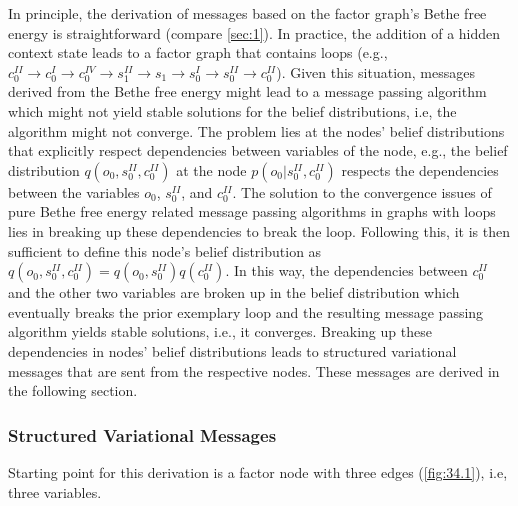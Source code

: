In principle, the derivation of messages based on the factor graph's Bethe free energy is straightforward (compare \cref{sec:1}). In practice, the addition of a hidden context state leads to a factor graph that contains loops (e.g., \(c^{\scriptscriptstyle II}_0 \rightarrow c^{\scriptscriptstyle I}_0 \rightarrow c^{\scriptscriptstyle IV}_0 \rightarrow s^{\scriptscriptstyle II}_1 \rightarrow s_1 \rightarrow s^{\scriptscriptstyle I}_0 \rightarrow s^{\scriptscriptstyle II}_0 \rightarrow c^{\scriptscriptstyle II}_0\)). Given this situation, messages derived from the Bethe free energy might lead to a message passing algorithm which might not yield stable solutions for the belief distributions, i.e, the algorithm might not converge. The problem lies at the nodes' belief distributions that explicitly respect dependencies between variables of the node, e.g., the belief distribution \(q(o_0,s^{\scriptscriptstyle II}_0,c^{\scriptscriptstyle II}_0)\) at the node \(p(o_0|s^{\scriptscriptstyle II}_0,c^{\scriptscriptstyle II}_0)\) respects the dependencies between the variables \(o_0\), \(s^{\scriptscriptstyle II}_0\), and \(c^{\scriptscriptstyle II}_0\). The solution to the convergence issues of pure Bethe free energy related message passing algorithms in graphs with loops lies in breaking up these dependencies to break the loop. Following this, it is then sufficient to define this node's belief distribution as \(q(o_0,s^{\scriptscriptstyle II}_0,c^{\scriptscriptstyle II}_0) = q(o_0,s^{\scriptscriptstyle II}_0)q(c^{\scriptscriptstyle II}_0)\). In this way, the dependencies between \(c^{\scriptscriptstyle II}_0\) and the other two variables are broken up in the belief distribution which eventually breaks the prior exemplary loop and the resulting message passing algorithm yields stable solutions, i.e., it converges. Breaking up these dependencies in nodes' belief distributions leads to structured variational messages that are sent from the respective nodes. These messages are derived in the following section.

\subsubsection{Structured Variational Messages}

Starting point for this derivation is a factor node with three edges (\cref{fig:34.1}), i.e, three variables.

